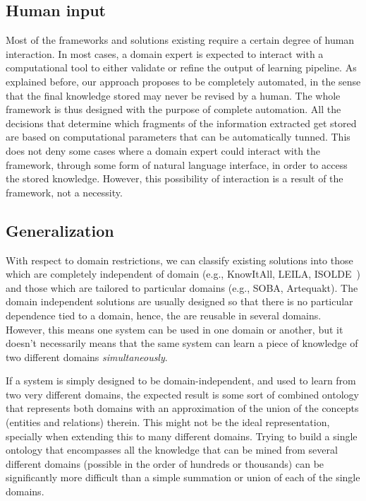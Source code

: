 \subsection{Human input}

Most of the frameworks and solutions existing require a certain degree of human interaction.
In most cases, a domain expert is expected to interact with a computational tool to either validate or
refine the output of learning pipeline.
As explained before, our approach proposes to be completely automated,
in the sense that the final knowledge stored may never be revised by a human. The whole framework is thus
designed with the purpose of complete automation. All the decisions that determine which fragments
of the information extracted get stored are based on computational parameters that can
be automatically tunned.
This does not deny some cases where a domain expert could interact with the framework,
through some form of natural language interface, in order to access the stored knowledge.
However, this possibility of interaction is a result of the framework, not a necessity.

\subsection{Generalization}

With respect to domain restrictions, we can classify existing solutions into those which are
completely independent of domain (e.g., KnowItAll, LEILA, ISOLDE~\cite{isolde}) and those which are tailored
to particular domains (e.g., SOBA, Artequakt). The domain independent solutions are usually designed
so that there is no particular dependence tied to a domain, hence, the are reusable in several domains.
However, this means one system can be used in one domain or another, but it doesn't necessarily
means that the same system can learn a piece of knowledge of two different
domains \emph{simultaneously}.

If a system is simply designed to be domain-independent, and used to learn from two very different
domains, the expected result is some sort of combined ontology that represents both domains with
an approximation of the union of the concepts (entities and relations) therein.
This might not be the ideal representation, specially when extending this to many different domains.
Trying to build a single ontology that encompasses all the knowledge that can be mined from
several different domains (possible in the order of hundreds or thousands) can be significantly
more difficult than a simple summation or union of each of the single domains.

